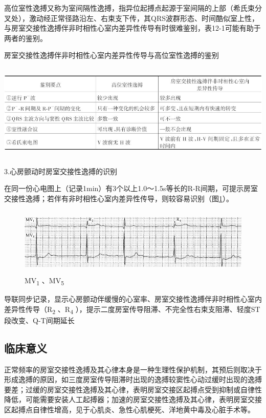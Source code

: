 高位室性逸搏又称为室间隔性逸搏，指异位起搏点起源于室间隔的上部（希氏束分叉处），激动经正常径路沿左、右束支下传，其QRS波群形态、时间酷似室上性，与房室交接性逸搏伴非时相性心室内差异性传导有时很难鉴别，表12-1可能有助于两者的鉴别。

\begin{table}[htbp]
\centering
\caption{房室交接性逸搏伴非时相性心室内差异性传导与高位室性逸搏的鉴别}
\label{tab12-1}
\includegraphics[width=6.22917in,height=1.8125in]{./images/Image00203.jpg}
\end{table}

3.心房颤动时房室交接性逸搏的识别

在同一份心电图上（记录1min）有3个以上1.0～1.5s等长的R-R间期，可提示房室交接性逸搏；若伴有非时相性心室内差异性传导，则较容易识别（图\ref{fig12-10}）。

\begin{figure}[!htbp]
 \centering
 \includegraphics[width=5.58333in,height=1.27083in]{./images/Image00204.jpg}
 \captionsetup{justification=centering}
 \caption{MV\textsubscript{1} 、MV\textsubscript{5}}
 \label{fig12-10}
  \end{figure} 
导联同步记录，显示心房颤动伴缓慢的心室率、房室交接性逸搏伴非时相性心室内差异性传导（R\textsubscript{2}
、R\textsubscript{4}
），提示二度房室传导阻滞、不完全性右束支阻滞、轻度ST段改变、Q-T间期延长

\protect\hypertarget{text00019.htmlux5cux23subid185}{}{}

\subsection{临床意义}

正常频率的房室交接性逸搏及其心律本身是一种生理性保护机制，其预后则取决于形成逸搏的原因，如三度房室传导阻滞时出现的逸搏较窦性心动过缓时出现的逸搏要差；过缓的房室交接性逸搏及其心律，表明房室交接区起搏点受到抑制或自律性降低，可能需要安装人工起搏器；加速的房室交接性逸搏及其心律，表明房室交接区起搏点自律性增高，见于心肌炎、急性心肌梗死、洋地黄中毒及心脏手术等。

